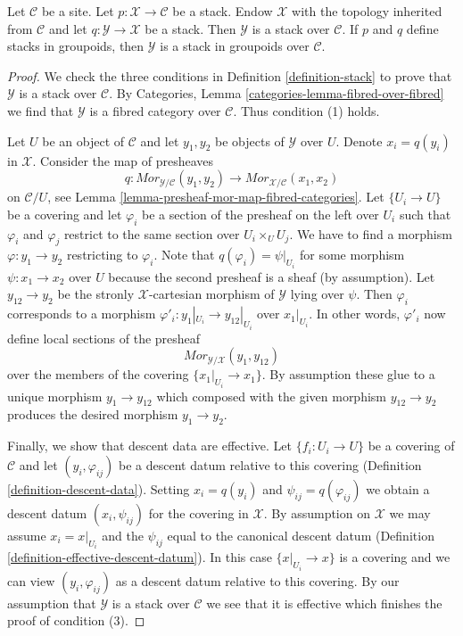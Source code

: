 \begin{lemma}
\label{lemma-stack-over-stack}
Let $\mathcal{C}$ be a site. Let $p : \mathcal{X} \to \mathcal{C}$
be a stack. Endow $\mathcal{X}$ with the topology inherited from
$\mathcal{C}$ and let $q : \mathcal{Y} \to \mathcal{X}$ be a stack.
Then $\mathcal{Y}$ is a stack over $\mathcal{C}$.
If $p$ and $q$ define stacks in groupoids, then
$\mathcal{Y}$ is a stack in groupoids over $\mathcal{C}$.
\end{lemma}

\begin{proof}
We check the three conditions in Definition \ref{definition-stack}
to prove that $\mathcal{Y}$ is a stack over $\mathcal{C}$.
By Categories, Lemma \ref{categories-lemma-fibred-over-fibred}
we find that $\mathcal{Y}$ is a fibred category over $\mathcal{C}$.
Thus condition (1) holds.

\medskip\noindent
Let $U$ be an object of $\mathcal{C}$ and let $y_1, y_2$ be objects
of $\mathcal{Y}$ over $U$. Denote $x_i = q(y_i)$ in $\mathcal{X}$.
Consider the map of presheaves
$$
q : \mathit{Mor}_{\mathcal{Y}/\mathcal{C}}(y_1, y_2)
\longrightarrow
\mathit{Mor}_{\mathcal{X}/\mathcal{C}}(x_1, x_2)
$$
on $\mathcal{C}/U$, see Lemma \ref{lemma-presheaf-mor-map-fibred-categories}.
Let $\{U_i \to U\}$ be a covering and let $\varphi_i$ be a section
of the presheaf on the left over $U_i$ such that $\varphi_i$ and
$\varphi_j$ restrict to the same section over $U_i \times_U U_j$.
We have to find a morphism $\varphi : y_1 \to y_2$ restricting to $\varphi_i$.
Note that $q(\varphi_i) = \psi|_{U_i}$ for some morphism
$\psi : x_1 \to x_2$ over $U$ because the second presheaf is a sheaf
(by assumption). Let $y_{12} \to y_2$ be the stronly $\mathcal{X}$-cartesian
morphism of $\mathcal{Y}$ lying over $\psi$. Then $\varphi_i$ corresponds
to a morphism $\varphi'_i : y_1|_{U_i} \to y_{12}|_{U_i}$ over $x_1|_{U_i}$.
In other words, $\varphi'_i$ now define local sections of the presheaf
$$
\mathit{Mor}_{\mathcal{Y}/\mathcal{X}}(y_1, y_{12})
$$
over the members of the covering $\{x_1|_{U_i} \to x_1\}$. By assumption these
glue to a unique morphism $y_1 \to y_{12}$ which composed with the given
morphism $y_{12} \to y_2$ produces the desired morphism $y_1 \to y_2$.

\medskip\noindent
Finally, we show that descent data are effective. Let $\{f_i : U_i \to U\}$
be a covering of $\mathcal{C}$ and let $(y_i, \varphi_{ij})$ be a descent
datum relative to this covering (Definition \ref{definition-descent-data}).
Setting $x_i = q(y_i)$ and $\psi_{ij} = q(\varphi_{ij})$
we obtain a descent datum $(x_i, \psi_{ij})$ for the covering in $\mathcal{X}$.
By assumption on $\mathcal{X}$ we may assume $x_i = x|_{U_i}$
and the $\psi_{ij}$ equal to the canonical descent datum
(Definition \ref{definition-effective-descent-datum}).
In this case $\{x|_{U_i} \to x\}$ is a covering and we can view
$(y_i, \varphi_{ij})$ as a descent datum relative to this covering.
By our assumption that $\mathcal{Y}$ is a stack over $\mathcal{C}$
we see that it is effective which finishes the proof of condition (3).


\end{proof}

